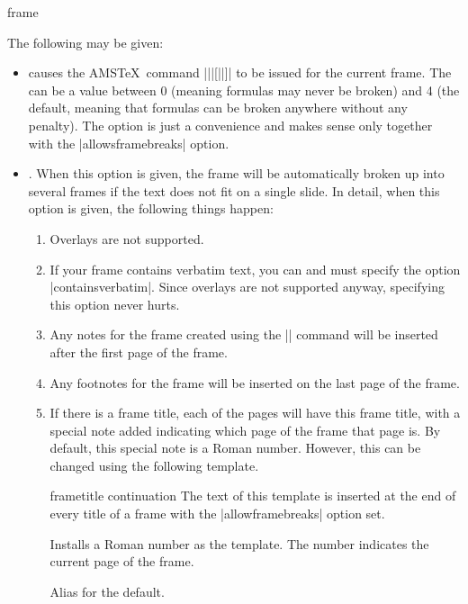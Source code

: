 \begin{environment}{{frame}%
    }
\begin{frame}[<+->][plain]
\begin{frame}[plain]
  The following  may be given:
  \begin{itemize}
  \item
     causes the AMS\TeX\ command
    |\allowdisplaybreaks||[||]| to be issued
    for the current frame. The  can be a
    value between 0 (meaning formulas may never be broken) and 4 (the
    default, meaning that formulas can be broken anywhere without any
    penalty). The option is just a convenience and makes sense only
    together with the |allowsframebreaks| option.  
  \item
    . When this option is
    given, the frame will be automatically broken up into several
    frames if the text does not fit on a single slide. In detail, when this
    option is given, the following things happen:
    \begin{enumerate}
    \item
      Overlays are not supported.
    \item
      If your frame contains verbatim text, you can and must specify the
      option |containsverbatim|. Since overlays are not supported
      anyway, specifying this option never hurts.
    \item
      Any notes for the frame created using the |\note| command will
      be inserted after the first page of the frame.
    \item
      Any footnotes for the frame will be inserted on the last page of
      the frame.
    \item
      If there is a frame title, each of the pages will have this
      frame title, with a special note added indicating which page of
      the frame that page is. By default, this special note is a
      Roman number. However, this can be changed using the following
      template.
      \begin{element}{frametitle continuation}\yes\yes\yes
        The text of this template is inserted at the end of every
        title of a frame with the |allowframebreaks| option set.
        \begin{templateoptions}
          Installs a Roman number as the template. The number
          indicates the current page of the frame.
          
          Alias for the default.
          

\end{templateoptions}
\end{element}
\end{enumerate}
\end{itemize}
\end{frame}
\end{frame}
\end{environment}
